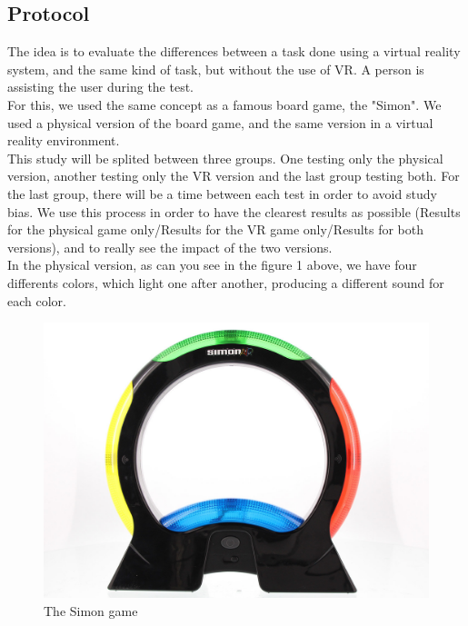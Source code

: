 \documentclass[12pt, openany, twocolumn]{article}
\begin{document}
    \subsection{Protocol}
    The idea is to evaluate the differences between a task done using a virtual reality system, and the same kind of task, but without the use of VR.
    A person is assisting the user during the test.
    \\

    For this, we used the same concept as a famous board game, the "Simon".
    We used a physical version of the board game, and the same version in a virtual reality environment.
    \\

    This study will be splited between three groups. One testing only the physical version, another testing only the VR version and the last group testing both.
    For the last group, there will be a time between each test in order to avoid study bias. We use this process in order to have the clearest results as possible (Results for the physical game only/Results for the VR game only/Results for both versions), and to really see the impact of the two versions. 
    \\

    In the physical version, as can you see in the figure 1 above, we have four differents colors, which light one after another, producing a different sound for each color.
    \\
    
    \begin{figure}
    \includegraphics[scale=0.185]{simon.jpg}
    \caption{The Simon game}
    \end{figure}
\end{document}
